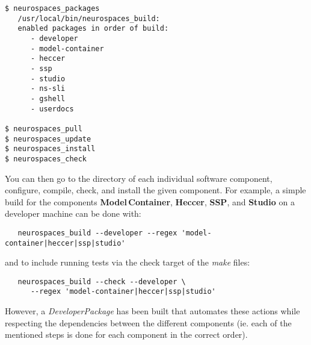 \documentclass[12pt]{article}
\begin{document}
\begin{enumerate}
\begin{verbatim}
$ neurospaces_packages
   /usr/local/bin/neurospaces_build:
   enabled packages in order of build:
      - developer
      - model-container
      - heccer
      - ssp
      - studio
      - ns-sli
      - gshell
      - userdocs

$ neurospaces_pull
$ neurospaces_update
$ neurospaces_install
$ neurospaces_check
\end{verbatim}
\end{enumerate}

You can then go to the directory of each individual software component, configure, compile, check, and install the given component. For example, a simple build for the components {\bf Model\,Container}, {\bf Heccer}, {\bf SSP}, and {\bf Studio} on a developer machine can be done with:  
\begin{verbatim}
   neurospaces_build --developer --regex 'model-container|heccer|ssp|studio'
\end{verbatim}
and to include running tests via the check target of the {\it make} files:
\begin{verbatim}
   neurospaces_build --check --developer \
      --regex 'model-container|heccer|ssp|studio'
\end{verbatim}
However, a {\it DeveloperPackage} has been built that automates these actions while respecting the dependencies between the different components (ie. each of the mentioned steps is done for each component in the correct order).




\end{document}
